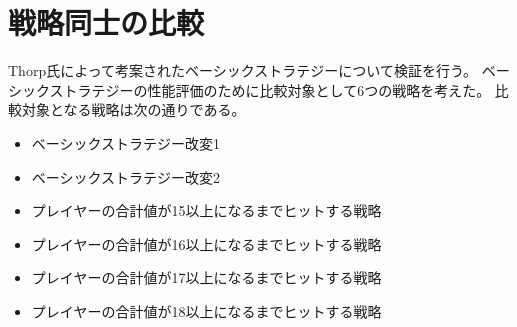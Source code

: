 





\section{戦略同士の比較}
Thorp氏によって考案されたベーシックストラテジーについて検証を行う。
ベーシックストラテジーの性能評価のために比較対象として6つの戦略を考えた。
比較対象となる戦略は次の通りである。

\begin{itemize}
  \item ベーシックストラテジー改変1
  \item ベーシックストラテジー改変2
  \item プレイヤーの合計値が15以上になるまでヒットする戦略
  \item プレイヤーの合計値が16以上になるまでヒットする戦略
  \item プレイヤーの合計値が17以上になるまでヒットする戦略
  \item プレイヤーの合計値が18以上になるまでヒットする戦略
\end{itemize}

